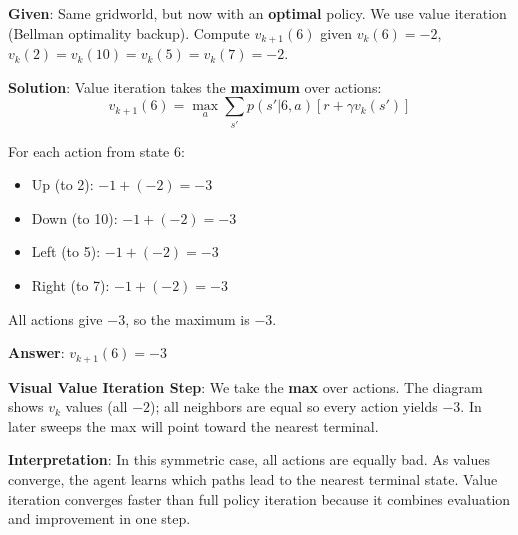 \documentclass[11pt,a4paper]{article}
\begin{document}
\begin{tcolorbox}[colback=green!5!white,colframe=green!75!black,title=\textbf{Worked Example 27: Value Iteration Step}]
\textbf{Given}: Same gridworld, but now with an \textbf{optimal} policy. We use value iteration (Bellman optimality backup). Compute $v_{k+1}(6)$ given $v_k(6) = -2$, $v_k(2) = v_k(10) = v_k(5) = v_k(7) = -2$.

\textbf{Solution}:
Value iteration takes the \textbf{maximum} over actions:
\[
v_{k+1}(6) = \max_a \sum_{s'} p(s'|6, a)[r + \gamma v_k(s')]
\]

For each action from state 6:
\begin{itemize}
    \item Up (to 2): $-1 + (-2) = -3$
    \item Down (to 10): $-1 + (-2) = -3$
    \item Left (to 5): $-1 + (-2) = -3$
    \item Right (to 7): $-1 + (-2) = -3$
\end{itemize}

All actions give $-3$, so the maximum is $-3$.

\textbf{Answer}: $v_{k+1}(6) = -3$

\textbf{Visual Value Iteration Step}: We take the \textbf{max} over actions. The diagram shows $v_k$ values (all $-2$); all neighbors are equal so every action yields $-3$. In later sweeps the max will point toward the nearest terminal.

\begin{center}
\end{center}

\textbf{Interpretation}: In this symmetric case, all actions are equally bad. As values converge, the agent learns which paths lead to the nearest terminal state. Value iteration converges faster than full policy iteration because it combines evaluation and improvement in one step.
\end{tcolorbox}
\end{document}
